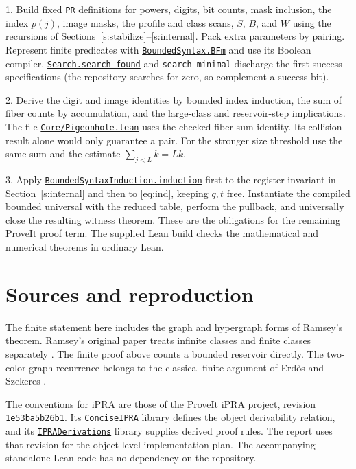 \documentclass[11pt,letterpaper]{article}
\newcommand{\code}[1]{\texttt{#1}}
\newcommand{\point}[1]{\par\smallskip{\bfseries\color{ink}#1.}\enspace}
\newcommand{\repo}[2]{\href{https://github.com/VladimirReshetnikov/ProveIt/blob/1e53ba5b26b144afb01bf6774d75cf35f6c760b2/#1}{#2}}
\newcommand{\derive}[2]{\repo{Logic/PrimitiveRecursiveArithmetic/Derivations/Lean/IPRADerivations/#1.lean}{#2}}
\begin{document}
1. Build fixed \code{PR} definitions for powers, digits, bit counts, mask inclusion, the index $p(j)$, image masks, the profile and class scans, $S$, $B$, and $W$ using the recursions of Sections~\ref{s:stabilize}--\ref{s:internal}. Pack extra parameters by pairing. Represent finite predicates with \derive{Foundations/BoundedSyntax}{\code{BoundedSyntax.BFm}} and use its Boolean compiler. \derive{Core/Search}{\code{Search.search\_found}} and \code{search\_minimal} discharge the first-success specifications (the repository searches for zero, so complement a success bit).

2. Derive the digit and image identities by bounded index induction, the sum of fiber counts by accumulation, and the large-class and reservoir-step implications. The file \derive{Core/Pigeonhole}{\code{Core/Pigeonhole.lean}} uses the checked fiber-sum identity. Its collision result alone would only guarantee a pair. For the stronger size threshold use the same sum and the estimate $\sum_{j<L} k=Lk$.

3. Apply \derive{Foundations/BoundedSyntaxInduction}{\code{BoundedSyntaxInduction.induction}} first to the register invariant in Section~\ref{s:internal} and then to \eqref{eq:ind}, keeping $q,t$ free. Instantiate the compiled bounded universal with the reduced table, perform the pullback, and universally close the resulting witness theorem. These are the obligations for the remaining ProveIt proof term. The supplied Lean build checks the mathematical and numerical theorems in ordinary Lean.
\clearpage

\section*{Sources and reproduction}
The finite statement here includes the graph and hypergraph forms of Ramsey's theorem. Ramsey's original paper treats infinite classes and finite classes separately \cite{ramsey}. The finite proof above counts a bounded reservoir directly. The two-color graph recurrence belongs to the classical finite argument of Erd\H{o}s and Szekeres \cite{es}.

\point{Repository basis} The conventions for iPRA are those of the \repo{Logic/PrimitiveRecursiveArithmetic/README.md}{ProveIt iPRA project}, revision \code{1e53ba5b26b1}. Its \repo{Logic/PrimitiveRecursiveArithmetic/ConciseIPRA/README.md}{\code{ConciseIPRA}} library defines the object derivability relation, and its \repo{Logic/PrimitiveRecursiveArithmetic/Derivations/README.md}{\code{IPRADerivations}} library supplies derived proof rules. The report uses that revision for the object-level implementation plan. The accompanying standalone Lean code has no dependency on the repository.
\end{document}
